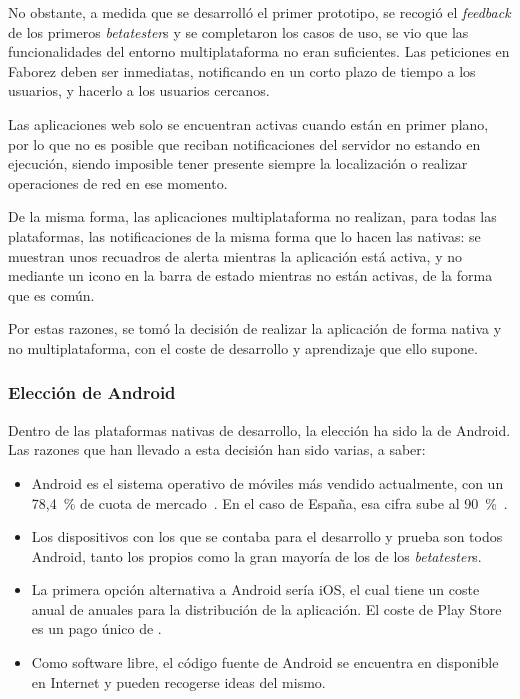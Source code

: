 \documentclass[main]{subfiles}
\begin{document}
No obstante, a medida que se desarrolló el primer prototipo, se recogió el \emph{feedback} de los primeros \emph{betatester}s y se completaron los casos de uso, se vio que las funcionalidades del entorno multiplataforma no eran suficientes. Las peticiones en Faborez deben ser inmediatas, notificando en un corto plazo de tiempo a los usuarios, y hacerlo a los usuarios cercanos.

Las aplicaciones web solo se encuentran activas cuando están en primer plano, por lo que no es posible que reciban notificaciones del servidor no estando en ejecución, siendo imposible tener presente siempre la localización o realizar operaciones de red en ese momento.

De la misma forma, las aplicaciones multiplataforma no realizan, para todas las plataformas, las notificaciones de la misma forma que lo hacen las nativas: se muestran unos recuadros de alerta mientras la aplicación está activa, y no mediante un icono en la barra de estado mientras no están activas, de la forma que es común.

Por estas razones, se tomó la decisión de realizar la aplicación de forma nativa y no multiplataforma, con el coste de desarrollo y aprendizaje que ello supone.

\subsubsection{Elección de Android}
Dentro de las plataformas nativas de desarrollo, la elección ha sido la de Android. Las razones que han llevado a esta decisión han sido varias, a saber:

\begin{itemize}
  \item Android es el sistema operativo de móviles más vendido actualmente, con un 78,4~\% de cuota de mercado~\autocite{gartnerandroid}. En el caso de España, esa cifra sube al 90~\%~\autocite{androidbycountry}.
  \item Los dispositivos con los que se contaba para el desarrollo y prueba son todos Android, tanto los propios como la gran mayoría de los de los \emph{betatester}s.
  \item La primera opción alternativa a Android sería iOS, el cual tiene un coste anual de  anuales para la distribución de la aplicación. El coste de Play Store es un pago único de .
  \item Como software libre, el código fuente de Android se encuentra en disponible en Internet y pueden recogerse ideas del mismo.
\end{itemize}
\end{document}
